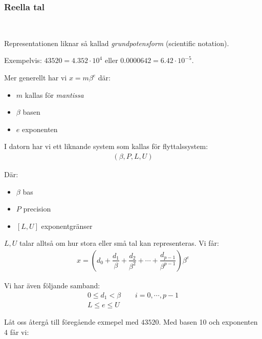 \subsubsection{Reella tal}\hfill\\
\par\bigskip
\noindent Representationen liknar så kallad \textit{grundpotensform} (scientific notation).
\par\bigskip
\noindent Exempelvis: $43520 = 4.352\cdot10^4$ eller $0.0000642 = 6.42\cdot10^{-5}$.\par
\noindent Mer generellt har vi $x = m\beta^e$ där:
\begin{itemize}
  \item $m$ kallas för \textit{mantissa}
  \item $\beta$ basen
  \item $e$ exponenten
\end{itemize}\par
\noindent I datorn har vi ett liknande system som kallas för flyttalssystem:
\begin{equation*}
  \begin{gathered}
    (\beta,P,L,U)
  \end{gathered}
\end{equation*}\par
\noindent Där:
\begin{itemize}
  \item $\beta$ bas
  \item $P$ precision
  \item $[L,U]$ exponentgränser
\end{itemize}\par
\noindent $L,U$ talar alltså om hur stora eller små tal kan representeras. Vi får:
\begin{equation*}
  \begin{gathered}
    x = \left(d_0+\dfrac{d_1}{\beta}+\dfrac{d_2}{\beta^2}+\cdots+\dfrac{d_{p-1}}{\beta^{p-1}}\right)\beta^e
  \end{gathered}
\end{equation*}
\par
\noindent Vi har även följande samband:
\begin{equation*}
  \begin{gathered}
    0\leq d_1<\beta\qquad i=0,\cdots,p-1\\
    L\leq e\leq U
  \end{gathered}
\end{equation*}
\par\bigskip
\noindent Låt oss återgå till föregående exmepel med $43520$. Med basen 10 och exponenten 4 får vi:
